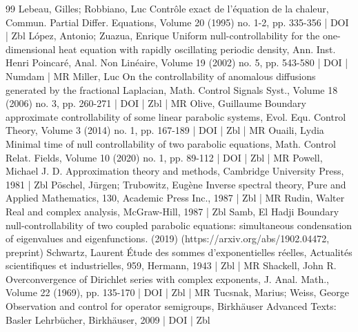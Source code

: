 \documentclass[10pt]{amsart}
\theoremstyle{definition}\newtheorem{defi}[theo]{Definition}\newtheorem{rema}[theo]{Remark}\newtheorem{exam}[theo]{Example}\newtheorem{exem}[theo]{Example}\newtheorem{nota}[theo]{Notation}
\begin{document}
\begin{thebibliography}{99}
Lebeau, Gilles; Robbiano, Luc Contrôle exact de l’équation de la chaleur, Commun. Partial Differ. Equations, Volume 20 (1995) no. 1-2, pp. 335-356 | DOI | Zbl
López, Antonio; Zuazua, Enrique Uniform null-controllability for the one-dimensional heat equation with rapidly oscillating periodic density, Ann. Inst. Henri Poincaré, Anal. Non Linéaire, Volume 19 (2002) no. 5, pp. 543-580 | DOI | Numdam | MR
Miller, Luc On the controllability of anomalous diffusions generated by the fractional Laplacian, Math. Control Signals Syst., Volume 18 (2006) no. 3, pp. 260-271 | DOI | Zbl | MR
Olive, Guillaume Boundary approximate controllability of some linear parabolic systems, Evol. Equ. Control Theory, Volume 3 (2014) no. 1, pp. 167-189 | DOI | Zbl | MR
Ouaili, Lydia Minimal time of null controllability of two parabolic equations, Math. Control Relat. Fields, Volume 10 (2020) no. 1, pp. 89-112 | DOI | Zbl | MR
Powell, Michael J. D. Approximation theory and methods, Cambridge University Press, 1981 | Zbl
Pöschel, Jürgen; Trubowitz, Eugène Inverse spectral theory, Pure and Applied Mathematics, 130, Academic Press Inc., 1987 | Zbl | MR
Rudin, Walter Real and complex analysis, McGraw-Hill, 1987 | Zbl
Samb, El Hadji Boundary null-controllability of two coupled parabolic equations: simultaneous condensation of eigenvalues and eigenfunctions. (2019) (https://arxiv.org/abs/1902.04472, preprint)
Schwartz, Laurent Étude des sommes d’exponentielles réelles, Actualités scientifiques et industrielles, 959, Hermann, 1943 | Zbl | MR
Shackell, John R. Overconvergence of Dirichlet series with complex exponents, J. Anal. Math., Volume 22 (1969), pp. 135-170 | DOI | Zbl | MR
Tucsnak, Marius; Weiss, George Observation and control for operator semigroups, Birkhäuser Advanced Texts: Basler Lehrbücher, Birkhäuser, 2009 | DOI | Zbl
\end{thebibliography}
\end{document}
